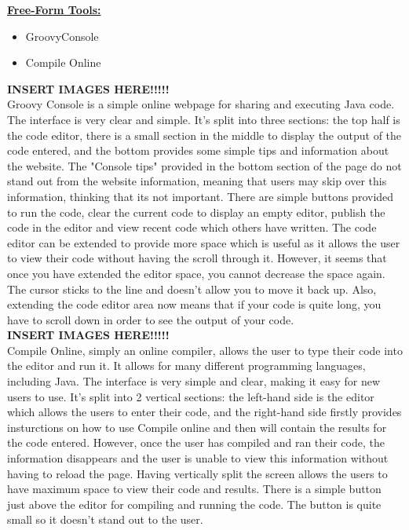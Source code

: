\documentclass{article}
\begin{document}
\textbf{\underline{Free-Form Tools:}}\\

\begin{itemize}
\item GroovyConsole
\item Compile Online
\end{itemize}

\textbf{INSERT IMAGES HERE!!!!!}\\

Groovy Console is a simple online webpage for sharing and executing Java code. The interface is very clear and simple. It's split into three sections: the top half is the code editor, there is a small section in the middle to display the output of the code entered, and the bottom provides some simple tips and information about the website. The "Console tips" provided in the bottom section of the page do not stand out from the website information, meaning that users may skip over this information, thinking that its not important. There are simple buttons provided to run the code, clear the current code to display an empty editor, publish the code in the editor and view recent code which others have written. The code editor can be extended to provide more space which is useful as it allows the user to view their code without having the scroll through it. However, it seems that once you have extended the editor space, you cannot decrease the space again. The cursor sticks to the line and doesn't allow you to move it back up. Also, extending the code editor area now means that if your code is quite long, you have to scroll down in order to see the output of your code. \\


\textbf{INSERT IMAGES HERE!!!!!}\\

Compile Online, simply an online compiler, allows the user to type their code into the editor and run it. It allows for many different programming languages, including Java. The interface is very simple and clear, making it easy for new users to use. It's split into 2 vertical sections: the left-hand side is the editor which allows the users to enter their code, and the right-hand side firstly provides insturctions on how to use Compile online and then will contain the results for the code entered. However, once the user has compiled and ran their code, the information disappears and the user is unable to view this information without having to reload the page. Having vertically split the screen allows the users to have maximum space to view their code and results. There is a simple button just above the editor for compiling and running the code. The button is quite small so it doesn't stand out to the user. 
\end{document}
